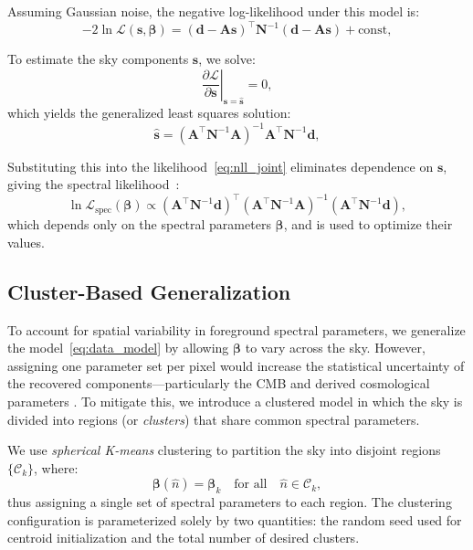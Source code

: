 \documentclass[fleqn,usenatbib]{mnras}
\begin{document}
Assuming Gaussian noise, the negative log-likelihood under this model is:
\begin{equation}
    -2 \ln \mathcal{L}(\mathbf{s}, \boldsymbol{\beta}) = (\mathbf{d} - \mathbf{A} \mathbf{s})^\top \mathbf{N}^{-1} (\mathbf{d} - \mathbf{A} \mathbf{s}) + \text{const},
    \label{eq:nll_joint}
\end{equation}

To estimate the sky components \( \mathbf{s} \), we solve:
\begin{equation}
    \left. \frac{\partial \mathcal{L}}{\partial \mathbf{s}} \right|_{\mathbf{s} = \hat{\mathbf{s}}} = 0,
\end{equation}
which yields the generalized least squares solution:
\begin{equation}
    \hat{\mathbf{s}} = \left( \mathbf{A}^\top \mathbf{N}^{-1} \mathbf{A} \right)^{-1} \mathbf{A}^\top \mathbf{N}^{-1} \mathbf{d},
    \label{eq:mle_solution}
\end{equation}

Substituting this into the likelihood~\eqref{eq:nll_joint} eliminates dependence on \( \mathbf{s} \), giving the spectral likelihood~\citep{Stompor_2009}:
\begin{equation}
    \ln \mathcal{L}_{\mathrm{spec}}(\boldsymbol{\beta}) \propto (\mathbf{A}^\top \mathbf{N}^{-1} \mathbf{d})^\top (\mathbf{A}^\top \mathbf{N}^{-1} \mathbf{A})^{-1} (\mathbf{A}^\top \mathbf{N}^{-1} \mathbf{d}),
    \label{eq:spectral_likelihood}
\end{equation}
which depends only on the spectral parameters \( \boldsymbol{\beta} \), and is used to optimize their values.

\subsection{Cluster-Based Generalization}
\label{subsec:sph_kmeans}

To account for spatial variability in foreground spectral parameters, we generalize the model~\eqref{eq:data_model} by allowing \( \boldsymbol{\beta} \) to vary across the sky. However, assigning one parameter set per pixel would increase the statistical uncertainty of the recovered components—particularly the CMB and derived cosmological parameters \citep{Errard2015}. To mitigate this, we introduce a clustered model in which the sky is divided into regions (or \textit{clusters}) that share common spectral parameters.

We use \textit{spherical K-means} clustering to partition the sky into disjoint regions \( \{ \mathcal{C}_k \} \), where:
\[
\boldsymbol{\beta}(\hat{n}) = \boldsymbol{\beta}_k \quad \text{for all} \quad \hat{n} \in \mathcal{C}_k,
\]
thus assigning a single set of spectral parameters to each region. The clustering configuration is parameterized solely by two quantities: the random seed used for centroid initialization and the total number of desired clusters.
\end{document}
